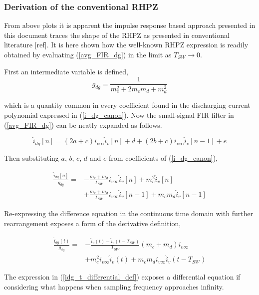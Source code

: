 \documentclass[conference]{IEEEtran}
\begin{document}
\subsubsection{Derivation of the conventional RHPZ}
From above plots it is apparent the impulse response based approach presented in this document traces the shape of the RHPZ as presented in conventional literature [ref]. It is here shown how the well-known RHPZ expression is readily obtained by evaluating (\ref{avg_FIR_dg}) in the limit as $T_{SW} \to 0$.

First an intermediate variable is defined,
\begin{equation}
g_{dg} = \frac{1}{m_c^2+2m_cm_d+m_d^2}
\end{equation} 

which is a quantity common in every coefficient found in the discharging current polynomial expressed in (\ref{i_dg_canon}). Now the small-signal FIR filter in (\ref{avg_FIR_dg}) can be neatly expanded as follows.

\begin{equation}
\hat{i}_{dg}[n] = (2a+c)i_{v\infty} \hat{i}_{v}[n] + d + 
(2b+c)i_{v\infty} \hat{i}_v[n-1] + e
\label{avg_FIR_dg_expanded}
\end{equation}

Then substituting $a$, $b$, $c$, $d$ and $e$ from coefficients of (\ref{i_dg_canon}),

 \begin{align}
 \frac{\hat{i}_{dg}[n]}{g_{dg}} = &-\frac{m_c + m_d}{T_{SW}} i_{v\infty} \hat{i}_{v}[n] + m_c^2 \hat{i}_v[n] \nonumber \\ 
 &+ \frac{m_c + m_d}{T_{SW}} i_{v\infty} \hat{i}_v[n-1] + m_c m_d \hat{i}_v[n-1]
 \label{avg_FIR_dg_expanded_coeffs}
 \end{align}
 
Re-expressing the difference equation in the continuous time domain with further rearrangement exposes a form of the derivative definition,

\begin{align}
	\frac{\hat{i}_{dg}(t)}{g_{dg}} =&  -\frac{\hat{i}_v(t) - \hat{i}_v (t-T_{SW})} {T_{SW}}
	(m_c + m_d) i_{v\infty} \nonumber \\
	&+	m_c^2 i_{v\infty}  \hat{i}_v(t)
	+ m_c m_d i_{v\infty}  \hat{i}_v(t-T_{SW})
	\label{idg_t_differential_def}
\end{align}

The expression in (\ref{idg_t_differential_def}) exposes a differential equation if considering what happens when sampling frequency approaches infinity.
	
\end{document}
